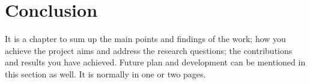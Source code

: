 
\section{Conclusion}
	It is a chapter to sum up the main points and findings of the work; how you achieve the project aims and address the research questions; the contributions and results you have achieved.  Future plan and development can be mentioned in this section as well. It is normally in one or two pages.